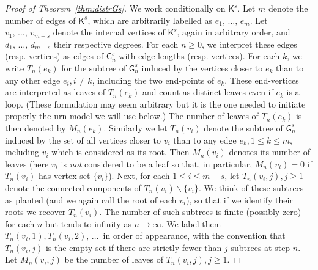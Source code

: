\documentclass[10pt]{amsart}
\theoremstyle{definition}\newtheorem{defi}[theo]{Definition}\newtheorem{rema}[theo]{Remark}\newtheorem{exam}[theo]{Example}\newtheorem{exem}[theo]{Example}\newtheorem{nota}[theo]{Notation}
\newcommand{\sG}{\mathsf{G}}
\newcommand{\sK}{\mathsf{K}}
\begin{document}
\begin{proof}[Proof of Theorem~\ref{thm:distrGs}]
We work conditionally on $\sK^s$. Let $m$ denote the number of edges of $\sK^s$, which are arbitrarily labelled as $e_1,\,\ldots,\,e_m$. Let $v_1,\,\ldots,\,v_{m-s}$ denote the internal vertices of $\sK^s$, again in arbitrary order, and $d_1,\,\ldots,\,d_{m-s}$ their respective degrees. For each $n \geq 0$, we interpret these edges (resp. vertices) as edges of $\sG^s_n$ with edge-lengths (resp. vertices). For each $k$, we write $T_n(e_k)$ for the subtree of $\sG^s_n$ induced by the vertices closer to $e_k$ than to any other edge $e_i,i\neq k$, including the two end-points of $e_k$. These end-vertices are interpreted as leaves of $T_n(e_k)$ and count as distinct leaves even if $e_k$ is a loop. (These formulation may seem arbitrary but it is the one needed to initiate properly the urn model we will use below.) The number of leaves of $T_n(e_k)$ is then denoted by $M_n(e_k)$. Similarly we let $T_n(v_{i})$ denote the subtree of $\sG^s_n$ induced by the set of all vertices closer to $v_i$ than to any edge $e_k, 1 \leq k \leq m$, including $v_i$ which is considered as its root. Then $M_n(v_i)$ denotes its number of leaves (here $v_i$ is \emph{not} considered to be a leaf so that, in particular, $M_n(v_i)=0$ if $T_n(v_{i})$ has vertex-set $\{v_i\}$). Next, for each $1 \leq i \leq m-s$, let $T_{n}(v_{i},j),j \geq 1$ denote the connected components of $T_n(v_{i})\backslash \{v_i\}$. We think of these subtrees as planted (and we again call the root of each $v_i$), so that if we identify their roots we recover $T_n(v_i)$. The number of such subtrees is finite (possibly zero) for each $n$ but tends to infinity as $n\rightarrow \infty$. We label them $T_{n}(v_{i},1), T_{n}(v_{i},2),\,\ldots\,$ in order of appearance, with the convention that $T_{n}(v_i,j)$ is the empty set if there are strictly fewer than $j$ subtrees at step $n$. Let $M_{n}(v_i,j)$ be the number of leaves of $T_{n}(v_{i},j), j \geq 1$.

\vspace{4pt}


\end{proof}
\end{document}
